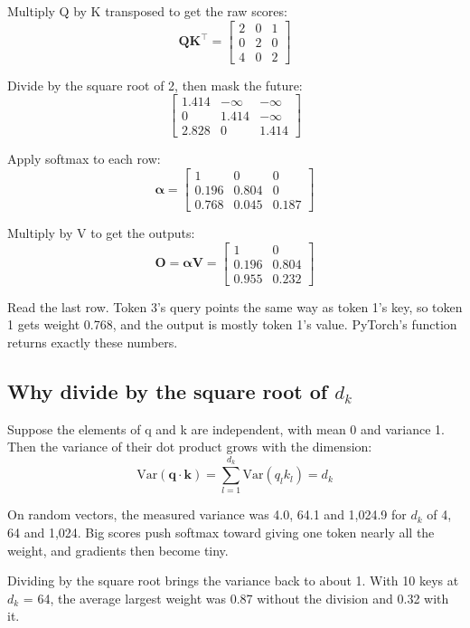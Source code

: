 \documentclass[11pt,a4paper]{article}
\begin{document}
Multiply Q by K transposed to get the raw scores:
\[
\mathbf{Q}\mathbf{K}^{\top}=\begin{bmatrix}2&0&1\\0&2&0\\4&0&2\end{bmatrix}
\]

Divide by the square root of 2, then mask the future:
\[
\begin{bmatrix}1.414&-\infty&-\infty\\0&1.414&-\infty\\2.828&0&1.414\end{bmatrix}
\]

Apply softmax to each row:
\[
\boldsymbol{\alpha}=\begin{bmatrix}1&0&0\\0.196&0.804&0\\0.768&0.045&0.187\end{bmatrix}
\]

Multiply by V to get the outputs:
\[
\mathbf{O}=\boldsymbol{\alpha}\mathbf{V}=\begin{bmatrix}1&0\\0.196&0.804\\0.955&0.232\end{bmatrix}
\]

Read the last row. Token 3's query points the same way as token 1's key, so token 1 gets weight 0.768, and the output is mostly token 1's value. PyTorch's function returns exactly these numbers.

\subsection*{Why divide by the square root of \texorpdfstring{$d_k$}{dk}}
{}

Suppose the elements of q and k are independent, with mean 0 and variance 1. Then the variance of their dot product grows with the dimension:
\[
\mathrm{Var}(\mathbf{q}\cdot\mathbf{k})=\sum_{l=1}^{d_k}\mathrm{Var}(q_l k_l)=d_k
\]

On random vectors, the measured variance was 4.0, 64.1 and 1,024.9 for $d_k$ of 4, 64 and 1,024. Big scores push softmax toward giving one token nearly all the weight, and gradients then become tiny.

Dividing by the square root brings the variance back to about 1. With 10 keys at $d_k$ = 64, the average largest weight was 0.87 without the division and 0.32 with it.
\end{document}
